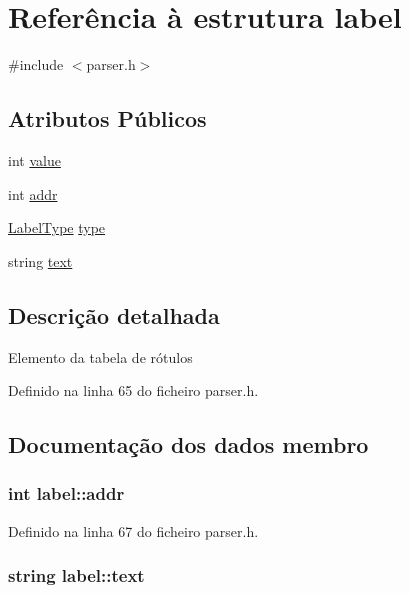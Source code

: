 \hypertarget{structlabel}{\section{Referência à estrutura label}
\label{structlabel}
}


{\ttfamily \#include $<$parser.\-h$>$}

\subsection*{Atributos Públicos}
\begin{DoxyCompactItemize}
\item 
int \hyperlink{structlabel_ac0cdaf20932b7fe75988a1d08510b72c}{value}
\item 
int \hyperlink{structlabel_af670c52b4f6b3aeaadc0ec95334e6e52}{addr}
\item 
\hyperlink{parser_8h_a2e33fafe7cfaf59b814f1fca20bdd0b9}{Label\-Type} \hyperlink{structlabel_ab48c1902da69d040b3a1e34740e82937}{type}
\item 
string \hyperlink{structlabel_a119fc486bd92631742a9fe2cf278d4df}{text}
\end{DoxyCompactItemize}


\subsection{Descrição detalhada}
Elemento da tabela de rótulos 

Definido na linha 65 do ficheiro parser.\-h.



\subsection{Documentação dos dados membro}
\hypertarget{structlabel_af670c52b4f6b3aeaadc0ec95334e6e52}{
\subsubsection[{addr}]{\setlength{\rightskip}{0pt plus 5cm}int label\-::addr}}\label{structlabel_af670c52b4f6b3aeaadc0ec95334e6e52}


Definido na linha 67 do ficheiro parser.\-h.

\hypertarget{structlabel_a119fc486bd92631742a9fe2cf278d4df}{
\subsubsection[{text}]{\setlength{\rightskip}{0pt plus 5cm}string label\-::text}}\label{structlabel_a119fc486bd92631742a9fe2cf278d4df}


